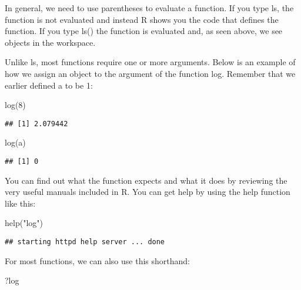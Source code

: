 \documentclass[
]{article}
\newenvironment{Shaded}{\begin{snugshade}}{\end{snugshade}}
\newcommand{\DecValTok}[1]{\textcolor[rgb]{0.00,0.00,0.81}{#1}}
\newcommand{\FunctionTok}[1]{\textcolor[rgb]{0.00,0.00,0.00}{#1}}
\newcommand{\NormalTok}[1]{#1}
\newcommand{\StringTok}[1]{\textcolor[rgb]{0.31,0.60,0.02}{#1}}
\begin{document}
In general, we need to use parentheses to evaluate a function. If you
type ls, the function is not evaluated and instead R shows you the code
that defines the function. If you type ls() the function is evaluated
and, as seen above, we see objects in the workspace.

Unlike ls, most functions require one or more arguments. Below is an
example of how we assign an object to the argument of the function log.
Remember that we earlier defined a to be 1:

\begin{Shaded}
\begin{Highlighting}[]
\FunctionTok{log}\NormalTok{(}\DecValTok{8}\NormalTok{)}
\end{Highlighting}
\end{Shaded}

\begin{verbatim}
## [1] 2.079442
\end{verbatim}

\begin{Shaded}
\begin{Highlighting}[]
\FunctionTok{log}\NormalTok{(a)}
\end{Highlighting}
\end{Shaded}

\begin{verbatim}
## [1] 0
\end{verbatim}

You can find out what the function expects and what it does by reviewing
the very useful manuals included in R. You can get help by using the
help function like this:

\begin{Shaded}
\begin{Highlighting}[]
\FunctionTok{help}\NormalTok{(}\StringTok{"log"}\NormalTok{)}
\end{Highlighting}
\end{Shaded}

\begin{verbatim}
## starting httpd help server ... done
\end{verbatim}

For most functions, we can also use this shorthand:

\begin{Shaded}
\begin{Highlighting}[]
\NormalTok{?log}
\end{Highlighting}
\end{Shaded}
\end{document}
